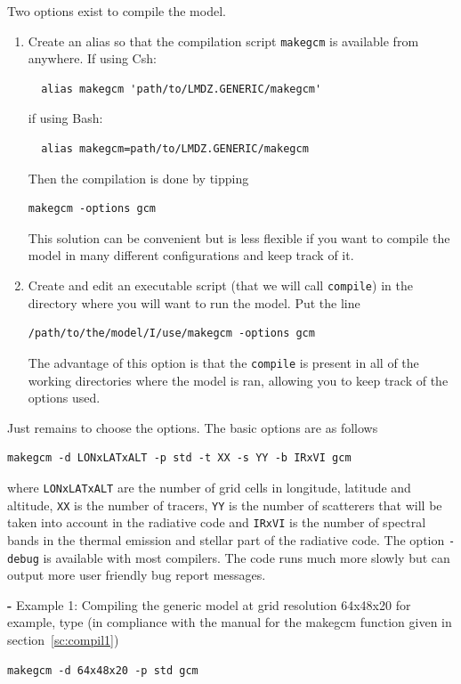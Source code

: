 Two options exist to compile the model. 
\begin{enumerate}
\item Create an alias so that the compilation script \verb"makegcm"
  is available from anywhere.
  If using Csh:
  \begin{verbatim}
  alias makegcm 'path/to/LMDZ.GENERIC/makegcm'
  \end{verbatim}
  if using Bash:
  \begin{verbatim}
  alias makegcm=path/to/LMDZ.GENERIC/makegcm
  \end{verbatim}
Then the compilation is done by tipping 
  \begin{verbatim}
makegcm -options gcm
  \end{verbatim}
This solution can be convenient but is less flexible if you want to compile the model in many different configurations and keep track of it.

\item Create and edit an executable script (that we will call \verb"compile") in the directory where you will want to run the model. Put the line
  \begin{verbatim}
/path/to/the/model/I/use/makegcm -options gcm
  \end{verbatim}
The advantage of this option is that the \verb"compile" is present in all of the working directories where the model is ran, allowing you to keep track of the options used.
\end{enumerate}

Just remains to choose the options. The basic options are as follows
\begin{verbatim}
makegcm -d LONxLATxALT -p std -t XX -s YY -b IRxVI gcm
\end{verbatim}
where \verb"LONxLATxALT" are the number of grid cells in longitude, latitude and altitude, \verb"XX" is the number of tracers, \verb"YY" is the number of scatterers that will be taken into account in the radiative code and \verb"IRxVI" is the number of spectral bands in the thermal emission and stellar part of the radiative code. The option \verb"-debug" is available with most compilers. The code runs much more slowly but can output more user friendly bug report messages.

{\bf -} Example 1: Compiling the generic model at grid resolution 64x48x20
for example, type (in compliance with the manual for the makegcm function
given in section~\ref{sc:compil1})

\begin{verbatim}
makegcm -d 64x48x20 -p std gcm
\end{verbatim}

